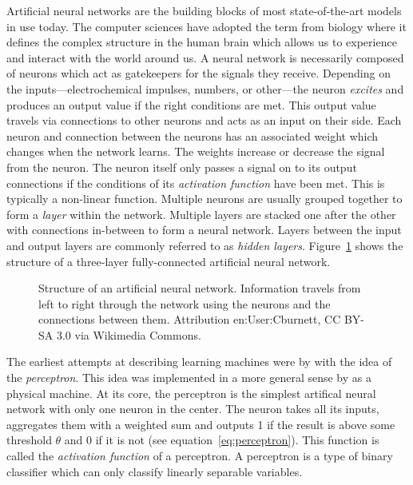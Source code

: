 \documentclass[draft,final]{vutinfth} %
\begin{document}
Artificial neural networks are the building blocks of most
state-of-the-art models in use today. The computer sciences have
adopted the term from biology where it defines the complex structure
in the human brain which allows us to experience and interact with the
world around us. A neural network is necessarily composed of neurons
which act as gatekeepers for the signals they receive. Depending on
the inputs—electrochemical impulses, numbers, or other—the neuron
\emph{excites} and produces an output value if the right conditions
are met. This output value travels via connections to other neurons
and acts as an input on their side. Each neuron and connection between
the neurons has an associated weight which changes when the network
learns. The weights increase or decrease the signal from the
neuron. The neuron itself only passes a signal on to its output
connections if the conditions of its \emph{activation function} have
been met. This is typically a non-linear function. Multiple neurons
are usually grouped together to form a \emph{layer} within the
network. Multiple layers are stacked one after the other with
connections in-between to form a neural network. Layers between the
input and output layers are commonly referred to as \emph{hidden
layers}. Figure~\ref{fig:neural-network} shows the structure of a
three-layer fully-connected artificial neural network.

\begin{figure}
  \centering
  \def\svgwidth{\columnwidth}
  \scalebox{0.75}{}
  \caption[Structure of an artificial neural network]{Structure of an
    artificial neural network. Information travels from left to right
    through the network using the neurons and the connections between
    them. Attribution en:User:Cburnett, CC BY-SA 3.0 via Wikimedia
    Commons.}
  \label{fig:neural-network}
\end{figure}

The earliest attempts at describing learning machines were by
\textcite{mcculloch1943} with the idea of the \emph{perceptron}. This
idea was implemented in a more general sense by
\textcite{rosenblatt1957,rosenblatt1962} as a physical machine. At its
core, the perceptron is the simplest artifical neural network with
only one neuron in the center. The neuron takes all its inputs,
aggregates them with a weighted sum and outputs 1 if the result is
above some threshold $\theta$ and 0 if it is not (see
equation~\ref{eq:perceptron}). This function is called the
\emph{activation function} of a perceptron. A perceptron is a type of
binary classifier which can only classify linearly separable
variables.
\end{document}
